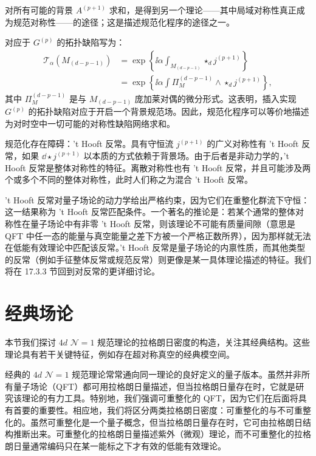 \begin{definition}[17.14] 对所有可能的背景 $A^{(p+1)}$ 求和，是得到另一个理论——其中局域对称性真正成为规范对称性——的途径；这是描述规范化程序的途径之一。\end{definition}

对应于 $G^{(p)}$ 的拓扑缺陷写为：
\[
\begin{aligned}
\mathcal{T}_\alpha(M_{(d-p-1)})&=\exp\left\{\ii\alpha\int_{M_{(d-p-1)}}\star_d j^{(p+1)}\right\}\\
&=\exp\left\{\ii\alpha\int\Pi^{(d-p-1)}_M\wedge\star_d j^{(p+1)}\right\},
\end{aligned}
\]
其中 $\Pi^{(d-p-1)}_M$ 是与 $M_{(d-p-1)}$ 庞加莱对偶的微分形式。这表明，插入实现 $G^{(p)}$ 的拓扑缺陷对应于开启一个背景规范场。因此，规范化程序可以等价地描述为对时空中一切可能的对称性缺陷网络求和。

\begin{definition}[17.15] 规范化存在障碍：'t Hooft 反常。具有守恒流 $j^{(p+1)}$ 的广义对称性有 't Hooft 反常，如果 $\dd\star j^{(p+1)}$ 以本质的方式依赖于背景场。由于后者是非动力学的，'t Hooft 反常是整体对称性的特征。离散对称性也有 't Hooft 反常，并且可能涉及两个或多个不同的整体对称性，此时人们称之为混合 't Hooft 反常。\end{definition}

't Hooft 反常对量子场论的动力学给出严格约束，因为它们在重整化群流下守恒：这一结果称为 't Hooft 反常匹配条件。一个著名的推论是：若某个通常的整体对称性在量子场论中有非零 't Hooft 反常，则该理论不可能有质量间隙（意思是 QFT 中任一态的能量与真空能量之差下方被一个严格正数所界），因为那样就无法在低能有效理论中匹配该反常。't Hooft 反常是量子场论的内禀性质，而其他类型的反常（例如手征整体反常或规范反常）则更像是某一具体理论描述的特征。我们将在 17.3.3 节回到对反常的更详细讨论。

\section{经典场论}

本节我们探讨 $4d$ $\mathcal{N}=1$ 规范理论的拉格朗日密度的构造，关注其经典结构。这些理论具有若干关键特征，例如存在超对称真空的经典模空间。

经典的 $4d$ $\mathcal{N}=1$ 规范理论常常通向同一理论的良好定义的量子版本。虽然并非所有量子场论（QFT）都可用拉格朗日量描述，但当拉格朗日量存在时，它就是研究该理论的有力工具。特别地，我们强调可重整化的 QFT，因为它们在后面将具有首要的重要性。相应地，我们将区分两类拉格朗日密度：可重整化的与不可重整化的。虽然可重整化是一个量子概念，但当拉格朗日量存在时，它可由拉格朗日结构推断出来。可重整化的拉格朗日量描述紫外（微观）理论，而不可重整化的拉格朗日量通常编码只在某一能标之下才有效的低能有效理论。


